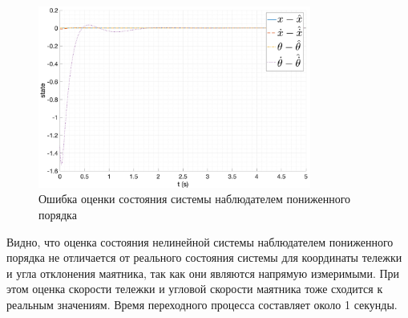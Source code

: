 \begin{figure}[ht!]
    \centering
    \includegraphics[width=0.8\textwidth]{media/plots/reduced_observer/reduced_observer_err_1.png}
    \caption{Ошибка оценки состояния системы наблюдателем пониженного порядка}
    \label{fig:reduced_observer_err_1}
\end{figure}
\FloatBarrier
Видно, что оценка состояния нелинейной системы наблюдателем пониженного порядка 
не отличается от реального состояния системы для координаты тележки и угла отклонения маятника,
так как они являются напрямую измеримыми. При этом оценка скорости тележки и угловой скорости
маятника тоже сходится к реальным значениям. Время переходного процесса составляет около 1 секунды.

